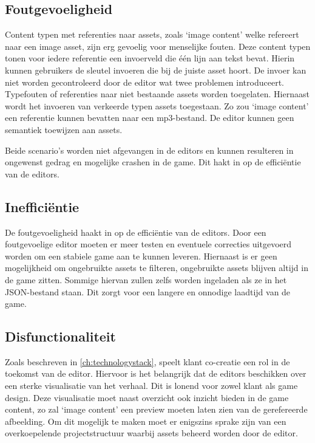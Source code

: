 \subsection{Foutgevoeligheid}
Content typen met referenties naar assets, zoals ‘image content’ welke refereert naar een image asset, zijn erg gevoelig voor menselijke fouten. Deze content typen tonen voor iedere referentie een invoerveld die één lijn aan tekst bevat. Hierin kunnen gebruikers de sleutel invoeren die bij de juiste asset hoort. De invoer kan niet worden gecontroleerd door de editor wat twee problemen introduceert. Typefouten of referenties naar niet bestaande assets worden toegelaten. Hiernaast wordt het invoeren van verkeerde typen assets toegestaan. Zo zou ‘image content’ een referentie kunnen bevatten naar een mp3-bestand. De editor kunnen geen semantiek toewijzen aan assets.

Beide scenario’s worden niet afgevangen in de editors en kunnen resulteren in ongewenst gedrag en mogelijke crashen in de game. Dit hakt in op de efficiëntie van de editors.

\subsection{Inefficiëntie}
De foutgevoeligheid haakt in op de efficiëntie van de editors. Door een foutgevoelige editor moeten er meer testen en eventuele correcties uitgevoerd worden om een stabiele game aan te kunnen leveren.
Hiernaast is er geen mogelijkheid om ongebruikte assets te filteren, ongebruikte assets blijven altijd in de game zitten. Sommige hiervan zullen zelfs worden ingeladen als ze in het JSON-bestand staan. Dit zorgt voor een langere en onnodige laadtijd van de game.

\subsection{Disfunctionaliteit}
Zoals beschreven in \autoref{ch:technologystack}, speelt klant co-creatie een rol in de toekomst van de editor. Hiervoor is het belangrijk dat de editors beschikken over een sterke visualisatie van het verhaal\cite{Schipper2015}. Dit is lonend voor zowel klant als game design. Deze visualisatie moet naast overzicht ook inzicht bieden in de game content, zo zal ‘image content’ een preview moeten laten zien van de gerefereerde afbeelding. Om dit mogelijk te maken moet er enigszins sprake zijn van een overkoepelende projectstructuur waarbij assets beheerd worden door de editor. 

